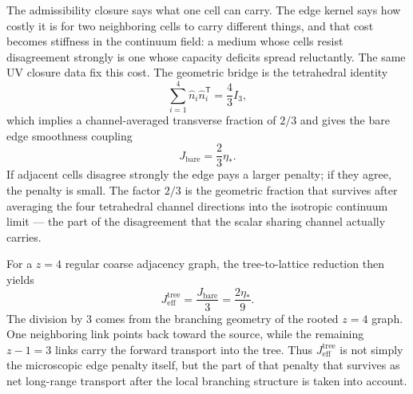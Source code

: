 \documentclass[11pt]{article}
\begin{document}
The admissibility closure says what one cell can carry. The edge kernel says how costly it is for two neighboring cells to carry different things, and that cost becomes stiffness in the continuum field: a medium whose cells resist disagreement strongly is one whose capacity deficits spread reluctantly. The same UV closure data fix this cost. The geometric bridge is the tetrahedral identity
\[
\sum_{i=1}^4 \hat n_i\hat n_i^{\mathsf T}=\frac{4}{3}I_3,
\]
which implies a channel-averaged transverse fraction of $2/3$ and gives the bare edge smoothness coupling
\[
J_{\mathrm{bare}}=\frac{2}{3}\eta_*.
\]
If adjacent cells disagree strongly the edge pays a larger penalty; if they agree, the penalty is small. The factor $2/3$ is the geometric fraction that survives after averaging the four tetrahedral channel directions into the isotropic continuum limit --- the part of the disagreement that the scalar sharing channel actually carries.

For a $z=4$ regular coarse adjacency graph, the tree-to-lattice reduction then yields
\[
J_{\mathrm{eff}}^{\mathrm{tree}}=\frac{J_{\mathrm{bare}}}{3}=\frac{2\eta_*}{9}.
\]
The division by $3$ comes from the branching geometry of the rooted $z=4$ graph. One neighboring link points back toward the source, while the remaining $z-1=3$ links carry the forward transport into the tree. Thus $J_{\mathrm{eff}}^{\mathrm{tree}}$ is not simply the microscopic edge penalty itself, but the part of that penalty that survives as net long-range transport after the local branching structure is taken into account.
\end{document}
